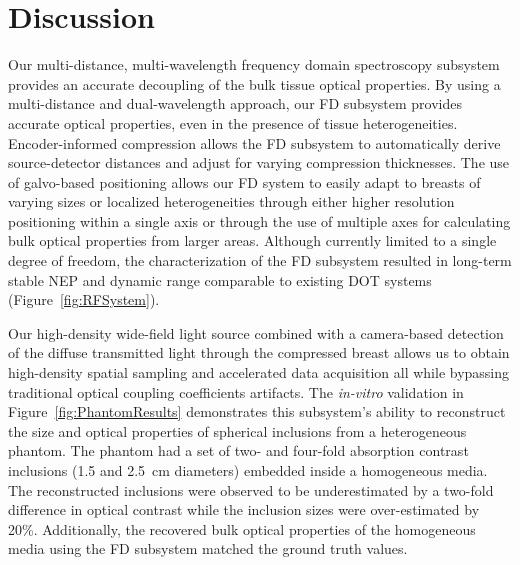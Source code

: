 


\section{Discussion}
\label{chap:omci:discussion}

Our multi-distance, multi-wavelength frequency domain spectroscopy subsystem provides an accurate decoupling of the bulk tissue optical properties. By using a multi-distance and dual-wavelength approach, our \ac{FD} subsystem provides accurate optical properties, even in the presence of tissue heterogeneities. Encoder-informed compression allows the \ac{FD} subsystem to automatically derive source-detector distances and adjust for varying compression thicknesses. The use of galvo-based positioning allows our \ac{FD} system to easily adapt to breasts of varying sizes or localized heterogeneities through either higher resolution positioning within a single axis or through the use of multiple axes for calculating bulk optical properties from larger areas. Although currently limited to a single degree of freedom, the characterization of the \ac{FD} subsystem resulted in long-term stable \ac{NEP} and dynamic range comparable to existing \ac{DOT} systems (Figure~\ref{fig:RFSystem}).  

Our high-density wide-field light source combined with a camera-based detection of the diffuse transmitted light through the compressed breast allows us to obtain high-density spatial sampling and accelerated data acquisition all while bypassing traditional optical coupling coefficients artifacts. The \textit{in-vitro} validation in Figure~\ref{fig:PhantomResults} demonstrates this subsystem's ability to reconstruct the size and optical properties of spherical inclusions from a heterogeneous phantom. The phantom had a set of two- and four-fold absorption contrast inclusions (1.5 and 2.5~cm diameters) embedded inside a homogeneous media. The reconstructed inclusions were observed to be underestimated by a two-fold difference in optical contrast while the inclusion sizes were over-estimated by 20\%. Additionally, the recovered bulk optical properties of the homogeneous media using the \ac{FD} subsystem matched the ground truth values.  

